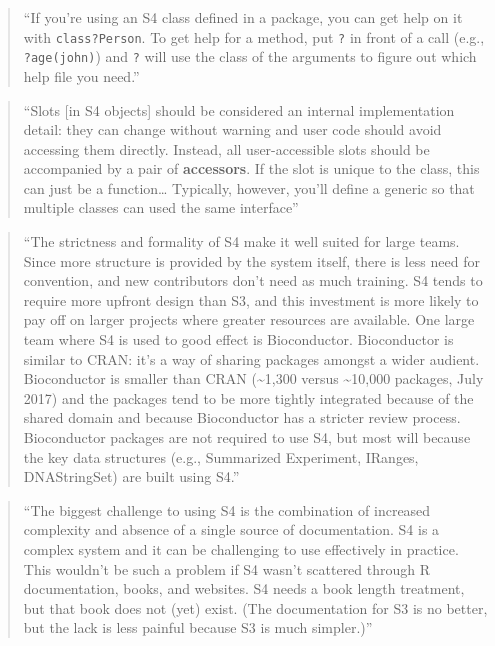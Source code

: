 \documentclass[]{tufte-book}
\begin{document}
\begin{quote}
``If you're using an S4 class defined in a package, you can get help on it
with \texttt{class?Person}. To get help for a method, put \texttt{?} in front of a call (e.g.,
\texttt{?age(john)}) and \texttt{?} will use the class of the arguments to figure out which help
file you need.'' \citep{wickham2019advanced}
\end{quote}

\begin{quote}
``Slots {[}in S4 objects{]} should be considered an internal implementation detail:
they can change without warning and user code should avoid accessing them
directly. Instead, all user-accessible slots should be accompanied by a pair
of \textbf{accessors}. If the slot is unique to the class, this can just be a function\ldots{}
Typically, however, you'll define a generic so that multiple classes can used
the same interface'' \citep{wickham2019advancedr}
\end{quote}

\begin{quote}
``The strictness and formality of S4 make it well suited for large teams. Since more
structure is provided by the system itself, there is less need for convention, and new
contributors don't need as much training. S4 tends to require more upfront design
than S3, and this investment is more likely to pay off on larger projects where
greater resources are available. One large team where S4 is used to good effect is
Bioconductor. Bioconductor is similar to CRAN: it's a way of sharing packages
amongst a wider audient. Bioconductor is smaller than CRAN (\textasciitilde1,300 versus \textasciitilde10,000 packages,
July 2017) and the packages tend to be more tightly integrated because of the
shared domain and because Bioconductor has a stricter review process. Bioconductor
packages are not required to use S4, but most will because the key data structures
(e.g., Summarized Experiment, IRanges, DNAStringSet) are built using S4.''
\citep{wickham2019advanced}
\end{quote}

\begin{quote}
``The biggest challenge to using S4 is the combination of increased complexity and
absence of a single source of documentation. S4 is a complex system and it can be
challenging to use effectively in practice. This wouldn't be such a problem if
S4 wasn't scattered through R documentation, books, and websites. S4 needs a
book length treatment, but that book does not (yet) exist. (The documentation for
S3 is no better, but the lack is less painful because S3 is much simpler.)''
\citep{wickham2019advanced}
\end{quote}
\end{document}
